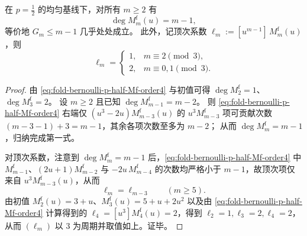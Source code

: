 \begin{proposition}[最大规范差与极端态数的三周期]\label{prop:fold-bernoulli-p-half-max-defect-degree-and-leading-period3}
在 \(p=\tfrac12\) 的均匀基线下，对所有 \(m\ge 2\) 有
\[
\deg M_m^{\mathrm f}(u)=m-1,
\]
等价地 \(G_m\le m-1\) 几乎处处成立。
此外，记顶次系数
\(
\ell_m:=[u^{m-1}]\,M_m^{\mathrm f}(u)
\)，则
\[
\ell_m=
\begin{cases}
1,& m\equiv 2\pmod 3,\\
2,& m\equiv 0,1\pmod 3.
\end{cases}
\]
\end{proposition}

\begin{proof}
由 \eqref{eq:fold-bernoulli-p-half-Mf-order4} 与初值可得 \(\deg M_2^{\mathrm f}=1\)、\(\deg M_3^{\mathrm f}=2\)。
设 \(m\ge 2\) 且已知 \(\deg M_{m-1}^{\mathrm f}=m-2\)。
则 \eqref{eq:fold-bernoulli-p-half-Mf-order4} 右端仅 \((u^3-2u)M_{m-3}^{\mathrm f}(u)\) 的 \(u^3 M_{m-3}^{\mathrm f}\) 项可贡献次数 \((m-3-1)+3=m-1\)，其余各项次数至多为 \(m-2\)；
从而 \(\deg M_m^{\mathrm f}=m-1\)，归纳完成第一式。
\par
对顶次系数，注意到 \(\deg M_m^{\mathrm f}=m-1\) 后，\eqref{eq:fold-bernoulli-p-half-Mf-order4} 中 \(M_{m-1}^{\mathrm f}\)、\((2u+1)M_{m-2}^{\mathrm f}\) 与 \(-2u\,M_{m-4}^{\mathrm f}\) 的次数均严格小于 \(m-1\)，故顶次项仅来自 \(u^3M_{m-3}^{\mathrm f}(u)\)，从而
\[
\ell_m=\ell_{m-3}\qquad(m\ge 5).
\]
由初值 \(M_2^{\mathrm f}(u)=3+u\)、\(M_3^{\mathrm f}(u)=5+u+2u^2\) 以及由 \eqref{eq:fold-bernoulli-p-half-Mf-order4} 计算得到的
\(
\ell_4=[u^3]M_4^{\mathrm f}(u)=2
\)，得到 \(\ell_2=1,\ell_3=2,\ell_4=2\)，从而 \((\ell_m)\) 以 \(3\) 为周期并取值如上。证毕。
\end{proof}

\endinput

